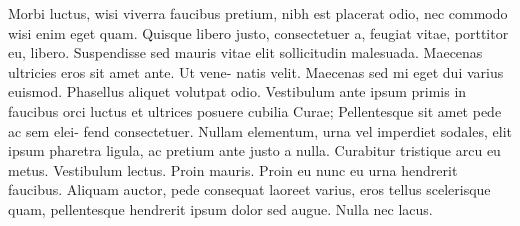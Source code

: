 Morbi luctus, wisi viverra faucibus pretium, nibh est placerat odio, nec commodo wisi enim eget quam. Quisque libero justo, consectetuer a, feugiat vitae, porttitor eu, libero. Suspendisse sed mauris vitae elit sollicitudin malesuada. Maecenas ultricies eros sit amet ante. Ut vene- natis velit. Maecenas sed mi eget dui varius euismod. Phasellus aliquet volutpat odio. Vestibulum ante ipsum primis in faucibus orci luctus et ultrices posuere cubilia Curae; Pellentesque sit amet pede ac sem elei- fend consectetuer. Nullam elementum, urna vel imperdiet sodales, elit ipsum pharetra ligula, ac pretium ante justo a nulla. Curabitur tristique arcu eu metus. Vestibulum lectus. Proin mauris. Proin eu nunc eu urna hendrerit faucibus. Aliquam auctor, pede consequat laoreet varius, eros tellus scelerisque quam, pellentesque hendrerit ipsum dolor sed augue. Nulla nec lacus.